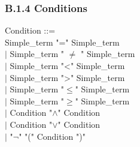 \documentclass[12pt,a4paper,draft]{article}
\begin{document}
\subsubsection{B.1.4 Conditions }
\footnotesize{
\begin{sloppypar} 

Condition ::= \\
\hspace*{0.20in}   Simple\_term  "="  Simple\_term\\
\hspace*{0.20in} $|$  Simple\_term  " $\ne$  "  Simple\_term\\
\hspace*{0.20in} $|$  Simple\_term  "<"  Simple\_term  \\
\hspace*{0.20in} $|$  Simple\_term  ">"  Simple\_term  \\
\hspace*{0.20in} $|$  Simple\_term  "$\leq$"  Simple\_term\\
\hspace*{0.20in} $|$  Simple\_term  "$\geq$"  Simple\_term\\
\hspace*{0.20in} $|$  Condition  "$\land$"  Condition\\
\hspace*{0.20in} $|$  Condition  "$\lor$"  Condition\\
\hspace*{0.20in} $|$ "$\neg$" "(" Condition ")" \\
 

\end{sloppypar}}
\end{document}
